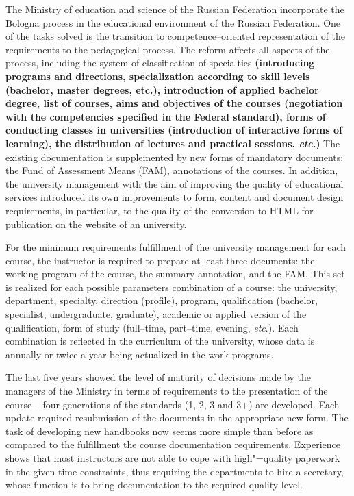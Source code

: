\documentclass[conference,a4paper]{IEEEtran}
\begin{document}
The Ministry of education and science of the Russian Federation incorporate the Bologna process in the educational environment of the Russian Federation.  One of the tasks solved is the transition to competence--oriented representation of the requirements to the pedagogical process.  The reform affects all aspects of the process, including the system of classification of specialties \textbf{(introducing programs and directions, specialization according to skill levels (bachelor, master degrees, etc.), introduction of applied bachelor degree, list of courses, aims and objectives of the courses (negotiation with the competencies specified in the Federal standard), forms of conducting classes in universities (introduction of interactive forms of learning), the distribution of lectures and practical sessions, \emph{etc}.)}  The existing documentation is supplemented by new forms of mandatory documents: the Fund of Assessment Means (FAM), annotations of the courses.  In addition, the university management with the aim of improving the quality of educational services introduced its own improvements to form, content and document design requirements, in particular, to the quality of the conversion to HTML for publication on the website of an university.

For the minimum requirements fulfillment of the university management for each course, the instructor is required to prepare at least three documents: the working program of the course, the summary annotation, and the FAM.  This set is realized for each possible parameters combination of a course: the university, department, specialty, direction (profile), program, qualification (bachelor, specialist, undergraduate, graduate), academic or applied version of the qualification, form of study (full--time, part--time, evening, \emph{etc}.).  Each combination is reflected in the curriculum of the university, whose data is annually or twice a year being actualized in the work programs.

The last five years showed the level of maturity of decisions made by the managers of the Ministry in terms of requirements to the presentation of the course -- four generations of the standards (1, 2, 3 and 3+) are developed.  Each update required resubmission of the documents in the appropriate new form.  The task of developing new handbooks now seems more simple than before as compared to the fulfillment the course documentation requirements.  Experience shows that most instructors are not able to cope with high"=quality paperwork in the given time constraints, thus requiring the departments to hire a secretary, whose function is to bring documentation to the required quality level.
\end{document}
